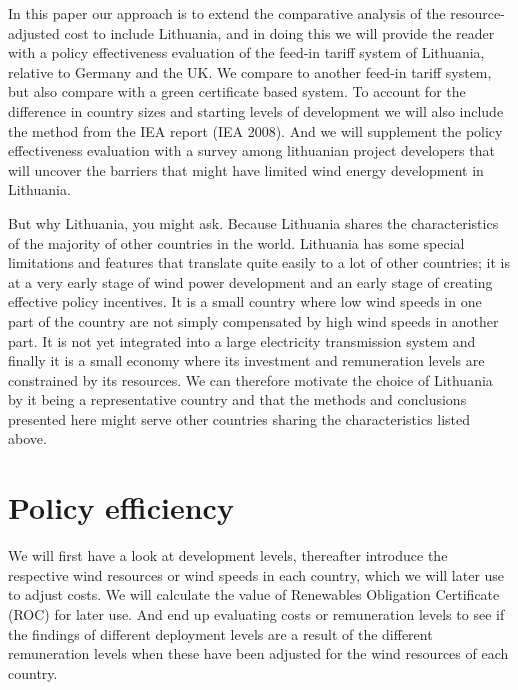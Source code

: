 \documentclass[a4paper, 12pt]{article}
\begin{document}
In this paper our approach is to extend the comparative analysis of the resource-adjusted cost to include Lithuania, and in doing this we will provide the reader with a policy effectiveness evaluation of the feed-in tariff system of Lithuania, relative to Germany and the UK. We compare to another feed-in tariff system, but also compare with a green certificate based system. To account for the difference in country sizes and starting levels of development we will also include the method from the IEA report (IEA 2008). And we will supplement the policy effectiveness evaluation with a survey among lithuanian project developers that will uncover the barriers that might have limited wind energy development in Lithuania. 

But why Lithuania, you might ask. Because Lithuania shares the characteristics of the majority of other countries in the world. Lithuania has some special limitations and features that translate quite easily to a lot of other countries; it is at a very early stage of wind power development and an early stage of creating effective policy incentives. It is a small country where low wind speeds in one part of the country are not simply compensated by high wind speeds in another part. It is not yet integrated into a large electricity transmission system and finally it is a small economy where its investment and remuneration levels are constrained by its resources. We can therefore motivate the choice of Lithuania by it being a representative country and that the methods and conclusions presented here might serve other countries sharing the characteristics listed above.

\section{Policy efficiency}
We will first have a look at development levels, thereafter introduce the respective wind resources or wind speeds in each country, which we will later use to adjust costs. We will calculate the value of Renewables Obligation Certificate (ROC) for later use. And end up evaluating costs or remuneration levels to see if the findings of different deployment levels are a result of the different remuneration levels when these have been adjusted for the wind resources of each country.
\end{document}
